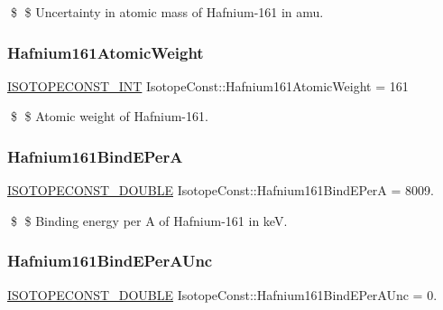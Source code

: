 \$ \$ Uncertainty in atomic mass of Hafnium-\/161 in amu. \mbox{\label{group___isotope_const-_hafnium-_hf161_ga2601b785342538f9641faf2fa264f373}} 
\subsubsection{\texorpdfstring{Hafnium161\+Atomic\+Weight}{Hafnium161AtomicWeight}}
{\footnotesize\ttfamily \mbox{\hyperlink{group___isotope_const-_macros_ga5f18360b3e99483a35c32d789e62621c}{I\+S\+O\+T\+O\+P\+E\+C\+O\+N\+S\+T\+\_\+\+I\+NT}} Isotope\+Const\+::\+Hafnium161\+Atomic\+Weight = 161}

\$ \$ Atomic weight of Hafnium-\/161. \mbox{\label{group___isotope_const-_hafnium-_hf161_ga61118553f81f411356902ca11c14e57d}} 
\subsubsection{\texorpdfstring{Hafnium161\+Bind\+E\+PerA}{Hafnium161BindEPerA}}
{\footnotesize\ttfamily \mbox{\hyperlink{group___isotope_const-_macros_ga8f45a7272ce02c0b4c65c44636ed719a}{I\+S\+O\+T\+O\+P\+E\+C\+O\+N\+S\+T\+\_\+\+D\+O\+U\+B\+LE}} Isotope\+Const\+::\+Hafnium161\+Bind\+E\+PerA = 8009.}

\$ \$ Binding energy per A of Hafnium-\/161 in keV. \mbox{\label{group___isotope_const-_hafnium-_hf161_gab3b743c2830b87fa8d6ea3811ec82ada}} 
\subsubsection{\texorpdfstring{Hafnium161\+Bind\+E\+Per\+A\+Unc}{Hafnium161BindEPerAUnc}}
{\footnotesize\ttfamily \mbox{\hyperlink{group___isotope_const-_macros_ga8f45a7272ce02c0b4c65c44636ed719a}{I\+S\+O\+T\+O\+P\+E\+C\+O\+N\+S\+T\+\_\+\+D\+O\+U\+B\+LE}} Isotope\+Const\+::\+Hafnium161\+Bind\+E\+Per\+A\+Unc = 0.}

